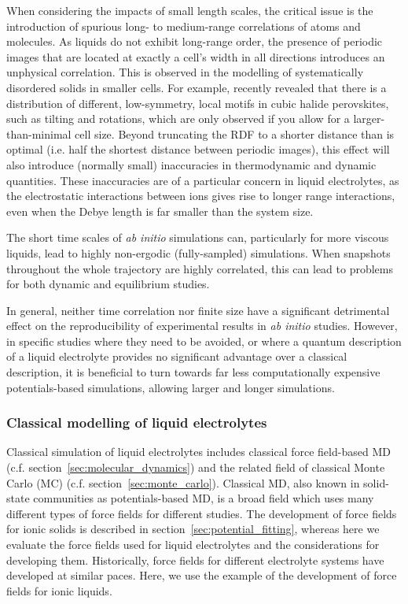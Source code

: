 \documentclass[../main.tex]{subfiles}
\begin{document}
When considering the impacts of small length scales, the critical issue is the introduction of spurious long- to medium-range correlations of atoms and molecules. As liquids do not exhibit long-range order, the presence of periodic images that are located at exactly a cell's width in all directions introduces an unphysical correlation. This is observed in the modelling of systematically disordered solids in smaller cells.\cite{Morgan_2011} For example, \citeauthor{Zhao_2020} recently revealed that there is a distribution of different, low-symmetry, local motifs in cubic halide perovskites, such as tilting and rotations, which are only observed if you allow for a larger-than-minimal cell size.\cite{Zhao_2020} Beyond truncating the RDF to a shorter distance than is optimal (i.e. half the shortest distance between periodic images), this effect will also introduce (normally small) inaccuracies in thermodynamic and dynamic quantities.\cite{Binder2009book, yeh_system-size_2004, botan_diffusion_2015, horbach_finite_1996} These inaccuracies are of a particular concern in liquid electrolytes, as the electrostatic interactions between ions gives rise to longer range interactions, even when the Debye length is far smaller than the system size.\cite{coles_correlation_2020}

The short time scales of \textit{ab initio} simulations can, particularly for more viscous liquids, lead to highly non-ergodic (fully-sampled) simulations. When snapshots throughout the whole trajectory are highly correlated,\cite{frenkel_understanding_2002} this can lead to problems for both dynamic and equilibrium studies. 

In general, neither time correlation nor finite size have a significant detrimental effect on the reproducibility of experimental results in \textit{ab initio} studies. However, in specific studies where they need to be avoided, or where a quantum description of a liquid electrolyte provides no significant advantage over a classical description, it is beneficial to turn towards far less computationally expensive potentials-based simulations, allowing larger and longer simulations.

\subsubsection{Classical modelling of liquid electrolytes}
\label{sec:electrolyte_classicMD}
Classical simulation of liquid electrolytes includes classical force field-based MD (c.f. section~\ref{sec:molecular_dynamics}) and the related field of classical Monte Carlo (MC) (c.f. section~\ref{sec:monte_carlo}). Classical MD, also known in solid-state communities as potentials-based MD, is a broad field which uses many different types of force fields for different studies. The development of force fields for ionic solids is described in section~\ref{sec:potential_fitting}, whereas here we evaluate the force fields used for liquid electrolytes and the considerations for developing them. Historically, force fields for different electrolyte systems have developed at similar paces. Here, we use the example of the development of force fields for ionic liquids.
\end{document}
